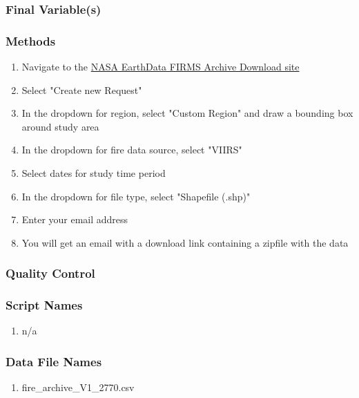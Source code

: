 \subsubsection*{Final Variable(s)}
\subsubsection*{Methods}
\begin{enumerate}
\item Navigate to the \href{https://firms.modaps.eosdis.nasa.gov/download/}{NASA EarthData FIRMS Archive Download site}
\item Select "Create new Request"
\item In the dropdown for region, select "Custom Region" and draw a bounding box around study area
\item In the dropdown for fire data source, select "VIIRS"
\item Select dates for study time period
\item In the dropdown for file type, select "Shapefile (.shp)"
\item Enter your email address
\item You will get an email with a download link containing a zipfile with the data
\end{enumerate}
\subsubsection*{Quality Control}
\subsubsection*{Script Names}
\begin{enumerate}
\item n/a
\end{enumerate}
\subsubsection*{Data File Names}
\begin{enumerate}
\item fire\_archive\_V1\_2770.csv
\end{enumerate}
